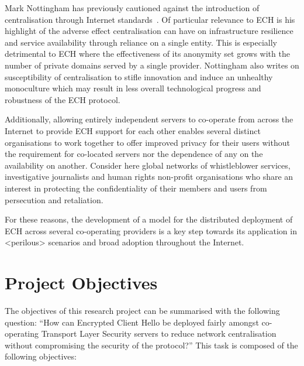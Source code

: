 Mark Nottingham has previously cautioned against the introduction of centralisation through Internet standards~\cite{rfc9518}. Of particular relevance to ECH is his highlight of the adverse effect centralisation can have on infrastructure resilience and service availability through reliance on a single entity. This is especially detrimental to ECH where the effectiveness of its anonymity set grows with the number of private domains served by a single provider. Nottingham also writes on susceptibility of centralisation to stifle innovation and induce an unhealthy monoculture which may result in less overall technological progress and robustness of the ECH protocol.

Additionally, allowing entirely independent servers to co-operate from across the Internet to provide ECH support for each other enables several distinct organisations to work together to offer improved privacy for their users without the requirement for co-located servers nor the dependence of any on the availability on another. Consider here global networks of whistleblower services, investigative journalists and human rights non-profit organisations who share an interest in protecting the confidentiality of their members and users from persecution and retaliation.

For these reasons, the development of a model for the distributed deployment of ECH across several co-operating providers is a key step towards its application in <perilous> scenarios and broad adoption throughout the Internet.









\section{Project Objectives}

The objectives of this research project can be summarised with the following question: ``How can Encrypted Client Hello be deployed fairly amongst co-operating Transport Layer Security servers to reduce network centralisation without compromising the security of the protocol?'' This task is composed of the following objectives:


